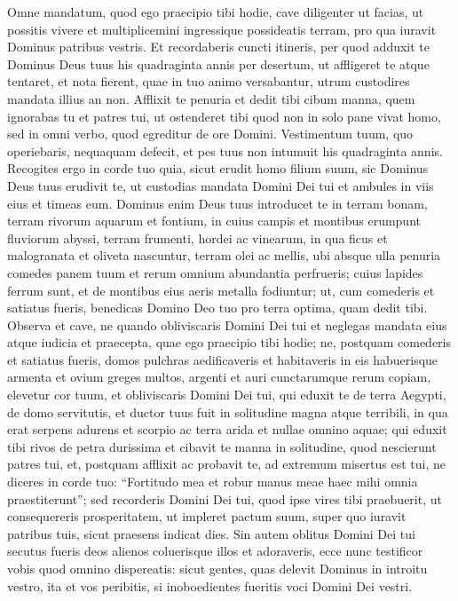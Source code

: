 \begin{biblechapter}
\begin{biblechapter}
\begin{biblechapter}
\begin{biblechapter}
\begin{biblechapter}
\begin{biblechapter}
\begin{biblechapter}
\begin{biblechapter}
\verse Omne mandatum, quod ego praecipio tibi hodie, cave diligenter ut facias, ut possitis vivere et multiplicemini ingressique possideatis terram, pro qua iuravit Dominus patribus vestris. 
\verse Et recordaberis cuncti itineris, per quod adduxit te Dominus Deus tuus his quadraginta annis per desertum, ut affligeret te atque tentaret, et nota fierent, quae in tuo animo versabantur, utrum custodires mandata illius an non. 
\verse Afflixit te penuria et dedit tibi cibum manna, quem ignorabas tu et patres tui, ut ostenderet tibi quod non in solo pane vivat homo, sed in omni verbo, quod egreditur de ore Domini. 
\verse Vestimentum tuum, quo operiebaris, nequaquam defecit, et pes tuus non intumuit his quadraginta annis. 
\verse Recogites ergo in corde tuo quia, sicut erudit homo filium suum, sic Dominus Deus tuus erudivit te, 
\verse ut custodias mandata Domini Dei tui et ambules in viis eius et timeas eum.
 \verse Dominus enim Deus tuus introducet te in terram bonam, terram rivorum aquarum et fontium, in cuius campis et montibus erumpunt fluviorum abyssi, 
\verse terram frumenti, hordei ac vinearum, in qua ficus et malogranata et oliveta nascuntur, terram olei ac mellis, 
\verse ubi absque ulla penuria comedes panem tuum et rerum omnium abundantia perfrueris; cuius lapides ferrum sunt, et de montibus eius aeris metalla fodiuntur; 
\verse ut, cum comederis et satiatus fueris, benedicas Domino Deo tuo pro terra optima, quam dedit tibi.
 \verse Observa et cave, ne quando obliviscaris Domini Dei tui et neglegas mandata eius atque iudicia et praecepta, quae ego praecipio tibi hodie; 
\verse ne, postquam comederis et satiatus fueris, domos pulchras aedificaveris et habitaveris in eis 
\verse habuerisque armenta et ovium greges multos, argenti et auri cunctarumque rerum copiam, 
\verse elevetur cor tuum, et obliviscaris Domini Dei tui, qui eduxit te de terra Aegypti, de domo servitutis, 
\verse et ductor tuus fuit in solitudine magna atque terribili, in qua erat serpens adurens et scorpio ac terra arida et nullae omnino aquae; qui eduxit tibi rivos de petra durissima 
 \verse et cibavit te manna in solitudine, quod nescierunt patres tui, et, postquam afflixit ac probavit te, ad extremum misertus est tui, 
\verse ne diceres in corde tuo: “Fortitudo mea et robur manus meae haec mihi omnia praestiterunt”; 
 \verse sed recorderis Domini Dei tui, quod ipse vires tibi praebuerit, ut consequereris prosperitatem, ut impleret pactum suum, super quo iuravit patribus tuis, sicut praesens indicat dies. 
\verse Sin autem oblitus Domini Dei tui secutus fueris deos alienos coluerisque illos et adoraveris, ecce nunc testificor vobis quod omnino dispereatis: 
\verse sicut gentes, quas delevit Dominus in introitu vestro, ita et vos peribitis, si inoboedientes fueritis voci Domini Dei vestri.
 

\end{biblechapter}
\end{biblechapter}
\end{biblechapter}
\end{biblechapter}
\end{biblechapter}
\end{biblechapter}
\end{biblechapter}
\end{biblechapter}
